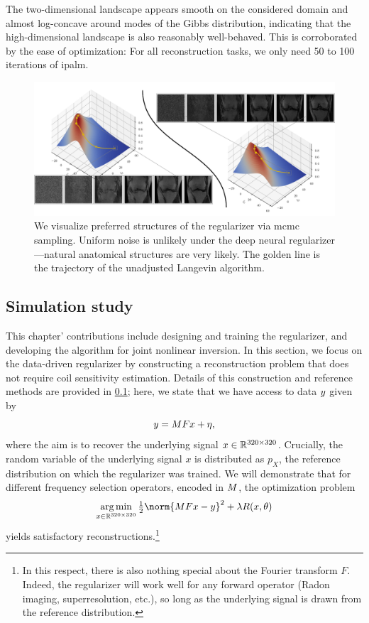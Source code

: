 The two-dimensional landscape appears smooth on the considered domain and almost log-concave around modes of the Gibbs distribution, indicating that the high-dimensional landscape is also reasonably well-behaved.
This is corroborated by the ease of optimization: For all reconstruction tasks, we only need \num{50} to \num{100} iterations of \gls{ipalm}.
\begin{figure}
	\centering
	\includegraphics[width=\linewidth]{mri-sampling}
	\caption[Sampling a deep neural regularizer]{%
		We visualize preferred structures of the regularizer via \gls{mcmc} sampling.
		Uniform noise is unlikely under the deep neural regularizer---natural anatomical structures are very likely.
		The golden line is the trajectory of the unadjusted Langevin algorithm.
	}%
	\label{fig:mri sampling deep neural regularizers}
\end{figure}
\subsection{Simulation study}%
\label{ssec:simulation study}
This chapter' contributions include designing and training the regularizer, and developing the algorithm for joint nonlinear inversion.
In this section, we focus on the data-driven regularizer by constructing a reconstruction problem that does not require coil sensitivity estimation.
Details of this construction and reference methods are provided in \cref{ssec:simulation study};
here, we state that we have access to data \( y \) given by
\begin{equation}
	y = M F x + \eta,
\end{equation}
where the aim is to recover the underlying signal \( x \in \R^{\numproduct{320x320}} \).
Crucially, the random variable of the underlying signal \( x \) is distributed as \( p_X \), the reference distribution on which the regularizer was trained.
We will demonstrate that for different frequency selection operators, encoded in \( M \), the optimization problem
\begin{equation}
	\argmin_{x \in \R^{\numproduct{320x320}}} \Half \norm{\Mask\Fourier x - y}^{\num{2}} + \lambda R(x, \theta)
\end{equation}
yields satisfactory reconstructions.\footnote{%
	In this respect, there is also nothing special about the Fourier transform \( F \).
	Indeed, the regularizer will work well for any forward operator (Radon imaging, superresolution, etc.), so long as the underlying signal is drawn from the reference distribution.
}

